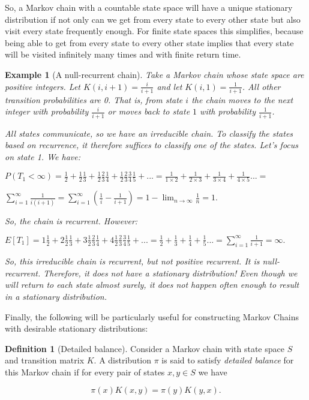 \documentclass{book}
\theoremstyle{plain}%
\newtheorem{prototheorem}{Example}[section]
\newenvironment{cexample}
   {\colorlet{shadecolor}{gray!10}\begin{shaded}\begin{prototheorem}}
   {\end{prototheorem}\end{shaded}}
\theoremstyle{definition}
\newtheorem{definition}{Definition}[section]
\newlength{\arrow}
\begin{document}
So, a Markov chain with a countable state space will have a unique stationary distribution if not only can we get from every state to every other state but also visit every state frequently enough. For finite state spaces this simplifies, because being able to get from every state to every other state implies that every state will be visited infinitely many times and with finite return time.


\begin{cexample}[A null-recurrent chain]

Take a Markov chain whose state space are positive integers. Let $K(i, i + 1) = \frac{i}{i+1}$ and let $K(i, 1) = \frac{1}{i + 1}$. All other transition probabilities are 0. That is, from state $i$ the chain moves to the next integer with probability $\frac{i}{i+1}$ or moves back to state $1$ with probability $\frac{1}{i + 1}$.

All states communicate, so we have an irreducible chain. To classify the states based on recurrence, it therefore suffices to classify one of the states. Let's focus on state 1. We have:

$P(T_1 < \infty) = \frac{1}{2} + \frac{1}{2}\frac{1}{3} + \frac{1}{2}\frac{2}{3}\frac{1}{4} +  \frac{1}{2}\frac{2}{3}\frac{3}{4}\frac{1}{5} + ... =  \frac{1}{1 \times 2} + \frac{1}{2 \times 3} + \frac{1}{3 \times 4} + \frac{1}{4 \times 5}  ... =$

$\sum_{i = 1}^\infty  \frac{1}{i(i+1)} = \sum_{i = 1}^\infty  (\frac{1}{i} - \frac{1}{i+1}) = 1 - \lim_{n\rightarrow\infty} \frac{1}{n} = 1.$

So, the chain is recurrent. However:

$E[T_1] = 1\frac{1}{2} + 2\frac{1}{2}\frac{1}{3} + 3\frac{1}{2}\frac{2}{3}\frac{1}{4} +  4\frac{1}{2}\frac{2}{3}\frac{3}{4}\frac{1}{5} + ... =  \frac{1}{2} + \frac{1}{3} + \frac{1}{4} + \frac{1}{5}  ... =  \sum_{i = 1}^\infty  \frac{1}{i+1} = \infty.$

So, this irreducible chain is recurrent, but not positive recurrent. It is null-recurrent. Therefore, it does not have a stationary distribution! Even though we will return to each state almost surely, it does not happen often enough to result in a stationary distribution.
\label{ex:markov_chain01}
\end{cexample}


Finally, the following will be particularly useful for constructing Markov Chains with desirable stationary distributions:

\begin{definition}[Detailed balance] Consider a Markov chain with state space $S$ and transition matrix $K$. A distribution $\pi$ is said to satisfy \emph{detailed balance} for this Markov chain if for every pair of states $x, y \in S$ we have 

$$\pi(x)K(x,y) = \pi(y)K(y,x).$$
\end{definition}
\end{document}
